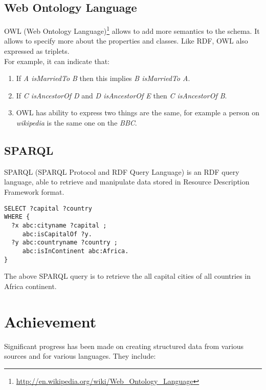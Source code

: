 \subsection{Web Ontology Language}
OWL (Web Ontology Language)\footnote{\url{http://en.wikipedia.org/wiki/Web_Ontology_Language}} allows to add more semantics to the schema. It allows to specify more about the properties and classes. Like RDF, OWL also expressed as triplets.\\
For example, it can indicate that:
\begin{enumerate}
\item{If \textit{A isMarriedTo B} then this implies \textit{B isMarriedTo A}.}
\item{If \textit{C isAncestorOf D} and \textit{D isAncestorOf E} then \textit{C isAncestorOf B}.}
\item{OWL has ability to express two things are the same, for example a person on \textit{wikipedia} is the same one on the \textit{BBC}.}
\end{enumerate}

\subsection{SPARQL}
SPARQL (SPARQL Protocol and RDF Query Language) is an RDF query language, able to retrieve and manipulate data stored in Resource Description Framework format.

\begin{verbatim}
SELECT ?capital ?country
WHERE {
  ?x abc:cityname ?capital ;
     abc:isCapitalOf ?y.
  ?y abc:countryname ?country ;
     abc:isInContinent abc:Africa.
}
\end{verbatim}
The above SPARQL query is to retrieve the all capital cities of all countries in Africa continent.


\section{Achievement}

Significant progress has been made on creating structured data from various sources and for various languages. They include:

